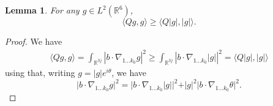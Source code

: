 \documentclass[11pt,a4paper]{article}
\theoremstyle{definition}
\theoremstyle{plain}
\newtheorem{lemma}[defi]{Lemma}
\begin{document}

\begin{lemma}
    \label{lem:pospreservingQ}
        For any $g\in L^2(\mathbb{R}^{6})$,
        $$\langle Q g,g\rangle \geq \langle Q \vert g\vert,\vert g\vert\rangle.$$
\end{lemma}
\begin{proof}
    We have
    \begin{align*}
        \langle Q g,g\rangle
        =\int_{\mathbb{R}^{3j}} \left\vert b\cdot\nabla_{1...k_0}g \right\vert^2
        \geq \int_{\mathbb{R}^{3j}} \left\vert b\cdot\nabla_{1...k_0}\vert g \vert\right\vert^2
        =\langle Q \vert g \vert,\vert g \vert\rangle
    \end{align*}
    using that, writing $g=\vert g\vert e^{i\theta}$, we have 
    $$\vert b\cdot\nabla_{1...k_0} g \vert^2 = \vert b\cdot\nabla_{1...k_0}\vert g \vert\vert^2 + \vert g \vert^2 \vert b\cdot\nabla_{1...k_0}\theta\vert^2.$$
\end{proof}
\end{document}
